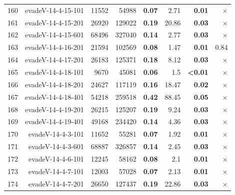 \begin{longtable}{lrr@{\hskip 12pt}r@{\hskip 12pt}r@{\hskip 12pt}r@{\hskip 12pt}r@{\hskip 12pt}r}
160 & \multirow{1}{*}{evadeV-14-4-15-101} & \multirow{1}{*}{11552} & \multirow{1}{*}{54988} & \textbf{0.07} & 2.71 & \textbf{0.01} & $\times$ \\
161 & \multirow{1}{*}{evadeV-14-4-15-201} & \multirow{1}{*}{26920} & \multirow{1}{*}{129022} & \textbf{0.19} & 20.86 & \textbf{0.03} & $\times$ \\
162 & \multirow{1}{*}{evadeV-14-4-15-601} & \multirow{1}{*}{68496} & \multirow{1}{*}{327040} & \textbf{0.14} & 2.77 & \textbf{0.03} & $\times$ \\
163 & \multirow{1}{*}{evadeV-14-4-16-201} & \multirow{1}{*}{21594} & \multirow{1}{*}{102569} & \textbf{0.08} & 1.47 & \textbf{0.01} & 0.84 \\
164 & \multirow{1}{*}{evadeV-14-4-17-201} & \multirow{1}{*}{26183} & \multirow{1}{*}{125371} & \textbf{0.18} & 8.12 & \textbf{0.03} & $\times$ \\
165 & \multirow{1}{*}{evadeV-14-4-18-101} & \multirow{1}{*}{9670} & \multirow{1}{*}{45081} & \textbf{0.06} & 1.5 & \textbf{<0.01} & $\times$ \\
166 & \multirow{1}{*}{evadeV-14-4-18-201} & \multirow{1}{*}{24627} & \multirow{1}{*}{117119} & \textbf{0.16} & 18.47 & \textbf{0.02} & $\times$ \\
167 & \multirow{1}{*}{evadeV-14-4-18-401} & \multirow{1}{*}{54218} & \multirow{1}{*}{259518} & \textbf{0.42} & 88.45 & \textbf{0.05} & $\times$ \\
168 & \multirow{1}{*}{evadeV-14-4-19-201} & \multirow{1}{*}{26215} & \multirow{1}{*}{125207} & \textbf{0.19} & 9.24 & \textbf{0.03} & $\times$ \\
169 & \multirow{1}{*}{evadeV-14-4-19-401} & \multirow{1}{*}{49168} & \multirow{1}{*}{234420} & \textbf{0.14} & 4.36 & \textbf{0.03} & $\times$ \\
170 & \multirow{1}{*}{evadeV-14-4-3-101} & \multirow{1}{*}{11652} & \multirow{1}{*}{55281} & \textbf{0.07} & 1.92 & \textbf{0.01} & $\times$ \\
171 & \multirow{1}{*}{evadeV-14-4-3-601} & \multirow{1}{*}{68887} & \multirow{1}{*}{326857} & \textbf{0.14} & 2.45 & \textbf{0.03} & $\times$ \\
172 & \multirow{1}{*}{evadeV-14-4-6-101} & \multirow{1}{*}{12245} & \multirow{1}{*}{58162} & \textbf{0.08} & 2.1 & \textbf{0.01} & $\times$ \\
173 & \multirow{1}{*}{evadeV-14-4-7-101} & \multirow{1}{*}{12003} & \multirow{1}{*}{57028} & \textbf{0.07} & 2.13 & \textbf{0.01} & $\times$ \\
174 & \multirow{1}{*}{evadeV-14-4-7-201} & \multirow{1}{*}{26650} & \multirow{1}{*}{127437} & \textbf{0.19} & 22.86 & \textbf{0.03} & $\times$ \\

\end{longtable}
